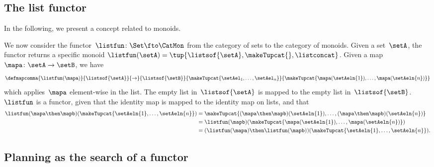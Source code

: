 \subsection{The list functor}
In the following, we present a concept related to monoids.

We now consider the functor~$\listfun\colon \Set \fto \CatMon$ from the category of sets to the category of monoids.
Given a set~$\setA$, the functor returns a specific monoid $\listfun(\setA)=\tup{\listsof{\setA},\makeTupcat{}, \listconcat}$.
Given a map~$\mapa\colon \setA\to \setB$, we have
\begin{equation}
    \defmapcomma{\listfun(\mapa)}
    {\listsof{\setA}}
    {\to}
    {\listsof{\setB}}
    {\makeTupcat{\setAel_1, \ldots, \setAel_n}}
    {\makeTupcat{\mapa(\setAeln{1}), \ldots, \mapa(\setAeln{n})}}
\end{equation}
which applies~$\mapa$ element-wise in the list.
The empty list in~$\listsof{\setA}$ is mapped to the empty list in~$\listsof{\setB}$.
    {}
$\listfun$ is a functor, given that the identity map is mapped to the identity map on lists, and that
\begin{equation}
    \begin{aligned}
        \listfun(\mapa \then \mapb)(\makeTupcat{\setAeln{1},\ldots,\setAeln{n}}) & =\makeTupcat{(\mapa \then \mapb)(\setAeln{1}), \ldots, (\mapa \then \mapb)(\setAeln{n})} \\
                                                                                & =\listfun(\mapb)(\makeTupcat{\mapa(\setAeln{1}), \ldots, \mapa(\setAeln{n})}) \\
                                                                                & =(\listfun(\mapa)\then \listfun(\mapb))(\makeTupcat{\setAeln{1}, \ldots, \setAeln{n}}).
    \end{aligned}
\end{equation}


\subsection{Planning as the search of a functor}

